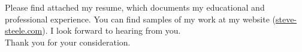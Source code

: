 \documentclass[11pt]{ncsuthesis4}
\newcommand{\tab}{\hspace*{20em}}
\begin{document}
\noindent Please find attached my resume, which documents my educational and professional experience. You can find samples of my work at my website (\href{http://www.steve-steele.com}{steve-steele.com}). I look forward to hearing from you.
\\

\noindent Thank you for your consideration.
\\

\tab{Sincerely,}

\tab{Steve Steele}




\nocite{*}
\end{document}
